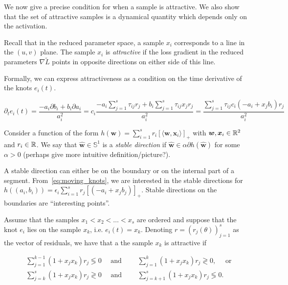 We now give a precise condition for when a sample is attractive. We also show that the set of attractive samples is a dynamical quantity which depends only on the activation.

Recall that in the reduced parameter space, a sample $x_i$ corresponds to a line in the $(u, v)$ plane. The sample $x_i$ is \emph{attractive} if the loss gradient in the reduced parameters $\nabla \tilde{L}$ points in opposite directions on either side of this line. 

Formally, we can express attractiveness as a condition on the time derivative of the knots $e_i(t)$. 

\begin{equation}\label{eq:moving_knots}
\partial_t e_i(t) = \frac{-a_i \partial b_i + b_i \partial a_i}{a_i^2} = c_i\frac{- a_i \sum_
{j=1}^s
\tau_{ij} r_j + b_i \sum_
{j=1}^s \tau_{ij} x_j r_j}{a_i^2} = \frac{\sum_{j=1}^s \tau_{ij}c_i(-a_i
+x_j b_i)r_j}{a_i^2}
\end{equation}

\begin{definition}
Consider a function of the form $h(\bm w) = \sum_{i=1}^s r_i [\langle \bm w,\bm x_i\rangle ]_+$ with $\bm w, \bm x_i \in \mathbb{R}^2$ and $r_i \in \mathbb{R}$. We say that $\hat{ \bm w} \in \mathbb S^1$ is a \emph{stable direction} if $\hat{ \bm w} \in \alpha \partial h(\hat {\bm w})$ for some $\alpha > 0$ (perhaps give more intuitive definition/picture?).
\end{definition}

A stable direction can either be on the boundary or on the internal part of a segment. From~\eqref{eq:moving_knots}, we are interested in the stable directions for $h((a_i,b_i)) = \epsilon_i \sum_{i=1}^s r_j [(-a_i + x_jb_j)]_+$. Stable directions on the boundaries are ``interesting points''.



Assume that the samples $x_1 < x_2 < \ldots < x_s$ are ordered and suppose that the knot $e_i$ lies on the sample $x_k$, i.e. $e_i(t) = x_k$. Denoting $r = (r_j(\theta))_{j=1}^s$ as the vector of residuals, we have that a the sample $x_k$ is attractive if

\begin{equation}
\begin{aligned}
    &\sum_{j=1}^{k-1} (1+x_j x_k) r_j \lessgtr 0 \quad \mbox{ and } \qquad \sum_{j=1}^k (1+x_j x_k) r_j \gtrless 0, \quad \mbox{ or }\\
    &\sum_{j=k}^s (1+x_j x_k) r_j \gtrless 0 \quad \mbox{ and } \qquad \sum_{j=k+1}^{s} (1+x_j x_k) r_j \lessgtr 0.\\
\end{aligned}
\end{equation}

